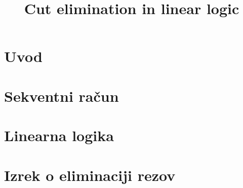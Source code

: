 \documentclass[mat1, tisk]{fmfdelo}
\title{Cut elimination in linear logic}
\theoremstyle{definition}
\begin{document}
\section{Uvod}


\section{Sekventni račun} \label{seq_calc}


\section{Linearna logika} \label{ll}


\section{Izrek o eliminaciji rezov} \label{ier}


% 
\end{document}
